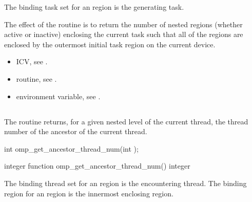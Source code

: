 \binding
The binding task set for an  region is the generating task. 

\effect
The effect of the  routine is to return the number of nested 
 regions (whether active or inactive) enclosing the current task such that all 
of the  regions are enclosed by the outermost initial task region on the 
current device.

\crossreferences
\begin{itemize}
\item {} ICV, see 
.

\item {} routine, see 
.

\item {} environment variable, see 
.
\end{itemize}










\subsection{}
\label{subsec:omp_get_ancestor_thread_num}
\summary
The  routine returns, for a given nested level of 
the current thread, the thread number of the ancestor of the current thread.

\begin{samepage}
\format
\ccppspecificstart
\begin{boxedcode}
int omp\_get\_ancestor\_thread\_num(int );
\end{boxedcode}
\ccppspecificend
\end{samepage}

\fortranspecificstart
\begin{boxedcode}
integer function omp\_get\_ancestor\_thread\_num()
integer 
\end{boxedcode}
\fortranspecificend

\binding
The binding thread set for an  region is the 
encountering thread. The binding region for an  
region is the innermost enclosing  region. 


